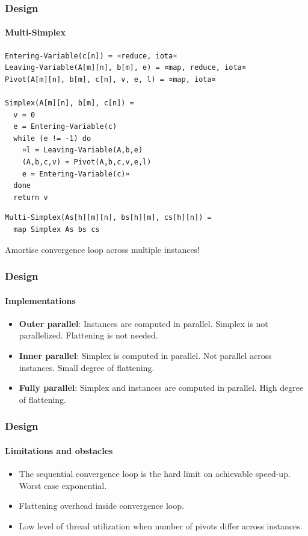 \documentclass{beamer}
\newcommand{\empr}[1]{\textcolor{CosRed}{ #1}}
\begin{document}

\begin{frame}[fragile]
\frametitle{Design}
\framesubtitle{Multi-Simplex}
\begin{lstlisting}
Entering-Variable(c[n]) = ¤reduce, iota¤
Leaving-Variable(A[m][n], b[m], e) = ¤map, reduce, iota¤
Pivot(A[m][n], b[m], c[n], v, e, l) = ¤map, iota¤

Simplex(A[m][n], b[m], c[n]) =
  v = 0
  e = Entering-Variable(c)
  while (e != -1) do
    ¤l = Leaving-Variable(A,b,e)
    (A,b,c,v) = Pivot(A,b,c,v,e,l)
    e = Entering-Variable(c)¤
  done
  return v
\end{lstlisting}
\pause
\begin{lstlisting}
Multi-Simplex(As[h][m][n], bs[h][m], cs[h][n]) =
  map Simplex As bs cs
\end{lstlisting}
\empr{Amortise convergence loop across multiple instances!}
\end{frame}

\begin{frame}
\frametitle{Design}
\framesubtitle{Implementations}
\begin{itemize}
	\item \textbf{Outer parallel}: Instances are computed in parallel. Simplex is not parallelized. Flattening is not needed.
	
	\item \textbf{Inner parallel}: Simplex is computed in parallel. Not parallel across instances. Small degree of flattening.
	
	\item \textbf{Fully parallel}: Simplex and instances are computed in parallel. High degree of flattening.
\end{itemize}
\end{frame}

\begin{frame}
\frametitle{Design}
\framesubtitle{Limitations and obstacles}
\begin{itemize}
	\item The sequential convergence loop is the hard limit on achievable speed-up. Worst case exponential. 
	
	\item Flattening overhead inside convergence loop.
	
	\item Low level of thread utilization when number of pivots differ across instances.
\end{itemize}
\end{frame}
\end{document}
